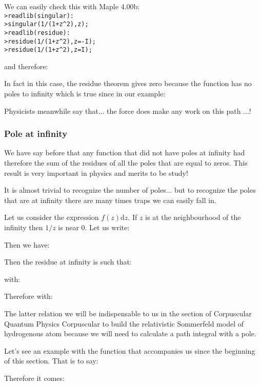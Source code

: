 	\pagebreak
	\begin{tcolorbox}[colframe=black,colback=white,sharp corners]
	We can easily check this with Maple 4.00b:\\
	
	\texttt{>readlib(singular):\\
	>singular(1/(1+z\string^2),z);\\
	>readlib(residue):\\
	>residue(1/(1+z\string^2),z=-I);\\
	>residue(1/(1+z\string^2),z=I);\\}

	and therefore:
	
	In fact in this case, the residue theorem gives zero because the function has no poles to infinity which is true since in our example:
	
	Physicists meanwhile say that... the force does make any work on this path ...!
	\end{tcolorbox}
	
	\subsubsection{Pole at infinity}
	We have say before that any function that did not have poles at infinity had therefore the sum of the residues of all the poles that are equal to zeros. This result is very important in physics and merits to be study!
	
	It is almost trivial to recognize the number of poles... but to recognize the poles that are at infinity there are many times traps we can easily fall in.
	
	Let us consider the expression $f(z)\mathrm{d}z$. If $z$ is at the neighbourhood of the infinity then $1/z$ is near $0$. Let us write:
	
	Then we have:
	
	Then the residue at infinity is such that:
	
	with:
	
	Therefore with:
	
	The latter relation we will be indispensable to us in the section of Corpuscular Quantum Physics Corpuscular to build the relativistic Sommerfeld model of hydrogenous atom because we will need to calculate a path integral with a pole.
	
	Let's see an example with the function that accompanies us since the beginning of this section. That is to say:
	
	Therefore it comes:
	
